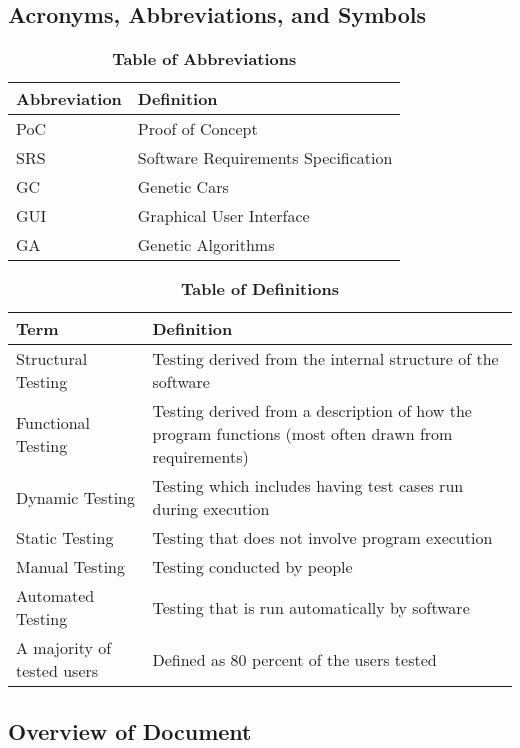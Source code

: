 \documentclass[12pt, titlepage]{article}
\begin{document}
\subsection{Acronyms, Abbreviations, and Symbols}
	
\begin{table}[hbp]
\caption{\textbf{Table of Abbreviations}} \label{Table}

\begin{tabularx}{\textwidth}{p{3cm}X}
\toprule
\textbf{Abbreviation} & \textbf{Definition} \\
\midrule
PoC & Proof of Concept\\
SRS & Software Requirements Specification\\
GC & Genetic Cars\\
GUI & Graphical User Interface\\
GA & Genetic Algorithms\\
\bottomrule
\end{tabularx}

\end{table}

\begin{table}[!htbp]
\caption{\textbf{Table of Definitions}} \label{Table}

\begin{tabularx}{\textwidth}{p{3cm}X}
\toprule
\textbf{Term} & \textbf{Definition}\\
\midrule
Structural Testing & Testing derived from the internal structure of the software\\
Functional Testing & Testing derived from a description of how the program functions (most often drawn from requirements)\\
Dynamic Testing & Testing which includes having test cases run during execution\\
Static Testing & Testing that does not involve program execution\\
Manual Testing & Testing conducted by people\\
Automated Testing & Testing that is run automatically by software\\
A majority of tested users & Defined as 80 percent of the users tested\\
\bottomrule
\end{tabularx}

\end{table}	

\subsection{Overview of Document}
\end{document}
